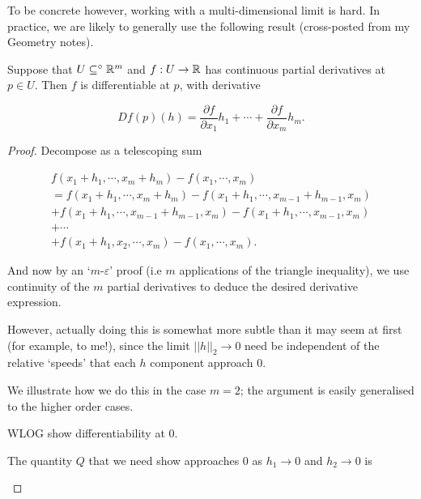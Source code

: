 \documentclass[11pt]{scrartcl}
\begin{document}
To be concrete however, working with a multi-dimensional limit is hard. In practice, we are likely to generally use the following result (cross-posted from my Geometry notes).

\begin{theorem}
        Suppose that $U \subseteq^\circ \mathbb R^m$ and $f : U \rightarrow \mathbb R$ has continuous partial derivatives at $p \in U$. Then $f$ is differentiable at $p$, with derivative
        
        \begin{equation}
            Df(p)(h) = \frac{\partial f}{\partial x_1}h_1 + \cdots + \frac{\partial f}{\partial x_m}h_m.
            \label{Deriv1}
        \end{equation}
    
        \begin{proof}
            Decompose as a telescoping sum
    
            \begin{align}
            f(x_1 + h_1, \cdots , x_m + h_m) - f(x_1, \cdots , x_m) \\ 
            = f(x_1 + h_1, \cdots , x_m + h_m) - f(x_1 + h_1, \cdots , x_{m-1} + h_{m-1} , x_m) \\
            + f(x_1 + h_1, \cdots , x_{m-1} + h_{m-1}, x_m) - f(x_1 + h_1, \cdots , x_{m-1}, x_m) \\
            + \cdots \\
            + f(x_1 + h_1, x_2, \cdots , x_m) - f(x_1, \cdots , x_m).
            \end{align}
    
            And now by an `$m$-$\varepsilon$' proof (i.e $m$ applications of the triangle inequality), we use continuity of the $m$ partial derivatives to deduce the desired derivative expression.

            However, actually doing this is somewhat more subtle than it may seem at first (for example, to me!), since the limit $||h||_2 \to 0$ need be independent of the relative `speeds' that each $h$ component approach 0.

            We illustrate how we do this in the case $m=2$; the argument is easily generalised to the higher order cases.

            \begin{example}
                WLOG show differentiability at 0.

                The quantity $Q$ that we need show approaches 0 as $h_1 \to 0$ and $h_2 \to 0$ is


\end{example}
\end{proof}
\end{theorem}
\end{document}
